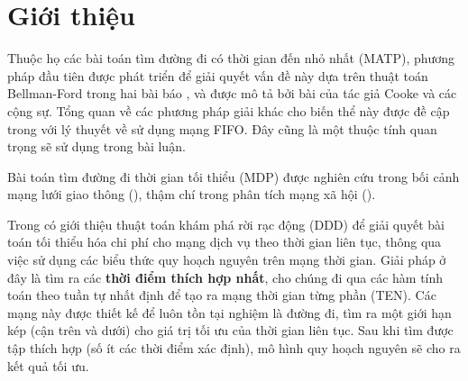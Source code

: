 \documentclass[../main.tex]{subfiles}
\begin{document}
\chapter{Giới thiệu}\label{introduce}


Thuộc họ các bài toán tìm đường đi có thời gian đến nhỏ nhất (MATP), phương pháp đầu
tiên được phát triển để giải quyết vấn đề này dựa trên thuật toán
Bellman-Ford trong hai bài báo \cite{bellman1958routing}, \cite{ford2010flows} và được mô tả bởi
bài \cite{cooke1966shortest} của tác giả Cooke và các cộng sự. Tổng quan về các phương pháp giải khác cho biến thể
này được đề cập trong \cite{dean2004shortest} với lý thuyết về sử dụng mạng FIFO. Đây cũng là một thuộc tính quan trọng sẽ sử dụng trong bài luận.

Bài toán tìm đường đi thời gian tối thiểu (MDP) được nghiên cứu trong bối cảnh mạng lưới giao thông (\cite{demiryurek2011online}), thậm chí trong phân tích mạng xã hội (\cite{gunturi2012information}).

Trong \cite{boland2017continuous} có giới thiệu thuật toán khám phá rời rạc động (DDD) để giải quyết bài
toán tối thiểu hóa chi phí cho mạng dịch vụ theo thời gian liên tục,
thông qua việc sử dụng các biểu thức quy hoạch nguyên trên mạng thời
gian. Giải pháp ở đây là tìm ra các \textbf{thời điểm thích hợp nhất},
cho chúng đi qua các hàm tính toán theo tuần tự nhất định để tạo ra mạng
thời gian từng phần (TEN). Các mạng này được thiết kế để luôn tồn tại nghiệm là đường đi, tìm
ra một giới hạn kép (cận trên và dưới) cho giá trị tối ưu của thời gian
liên tục. Sau khi tìm được tập thích hợp (số ít các thời điểm xác định), mô hình
quy hoạch nguyên sẽ cho ra kết quả tối ưu.


\end{document}
